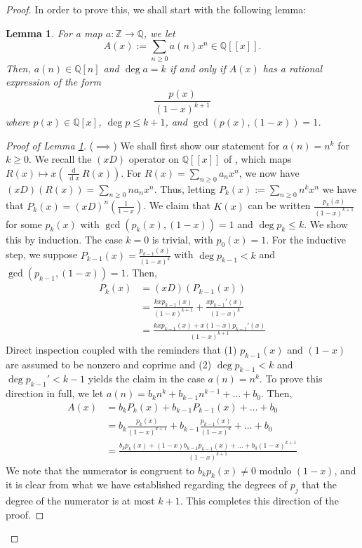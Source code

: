 \documentclass[english]{article}
\renewcommand{\d}[1]{\ensuremath{\operatorname{d}\!{#1}}}
\newcommand{\ddx}[1]{\frac{\d{}}{\d{#1}}}
\newcommand{\ZZ}{\mathbb{Z}}
\newcommand{\QQ}{\mathbb{Q}}
\newenvironment{subproof}[1][\proofname]{%
	\renewcommand{\qedsymbol}{$\blacksquare$}%
	\begin{proof}[#1]%
	}{%
	\end{proof}%
}
\newtheorem{lemma}[theorem]{Lemma}
\theoremstyle{remark}
\theoremstyle{definition}
\begin{document}
\begin{proof}
In order to prove this, we shall start with the following lemma: \begin{lemma}\label{lem:121b}For a map $a:\ZZ\to \QQ$, we let $$A(x):=\sum_{n\geq 0} a(n)x^n\in \QQ[[x]].$$ Then, $a(n)\in \QQ[n]$ and $\deg a=k$ if and only if $A(x)$ has a rational expression of the form $$\frac{p(x)}{(1-x)^{k+1}}$$ where $p(x)\in \QQ[x]$, $\deg p\leq k+1$, and $\gcd(p(x),(1-x))=1$.
\end{lemma}
\begin{subproof}[Proof of Lemma \ref{lem:121b}]
	($\implies $) We shall first show our statement for $a(n)=n^k$ for $k\geq 0$. We recall the $(xD)$ operator on $\QQ[[x]]$ of \cite{genfology}, which maps $R(x)\mapsto x(\ddx{x}R(x))$. For $R(x)=\sum_{n\geq 0}a_nx^n$, we now have $(xD)(R(x))=\sum_{n\geq 0}n a_nx^n$. Thus, letting $P_k(x):=\sum_{n\geq 0}n^kx^n$ we have that $P_k(x)=(xD)^n\left(\frac{1}{1-x}\right)$. We claim that $K(x)$ can be written $\frac{p_k(x)}{(1-x)^{k+1}}$ for some $p_k(x)$ with $\gcd (p_k(x),(1-x))=1$ and $\deg p_k\leq k$. We show this by induction. The case $k=0$ is trivial, with $p_0(x)=1$. For the inductive step, we suppose $P_{k-1}(x)=\frac{p_{k-1}(x)}{(1-x)^k}$ with $\deg{p_{k-1}}<k$ and $\gcd(p_{k-1},(1-x))=1$. Then, \begin{align*}P_k(x)&=(xD)(P_{k-1}(x))\\&=\frac{kxp_{k-1}(x)}{(1-x)^{k+1}}+\frac{xp_{k-1}'(x)}{(1-x)^{k}}\\&=\frac{kxp_{k-1}(x)+x(1-x)p_{k-1}'(x)}{(1-x)^{k+1}}\end{align*}
	Direct inspection coupled with the reminders that (1) $p_{k-1}(x)$ and $(1-x)$ are assumed to be nonzero and coprime and (2) $\deg p_{k-1}<k$ and $\deg p_{k-1}'<k-1$ yields the claim in the case $a(n)=n^k$. To prove this direction in full, we let $a(n)=b_kn^k+b_{k-1}n^{k-1}+\hdots+b_0$. Then, \begin{align*}
		A(x)&=b_kP_k(x)+b_{k-1}P_{k-1}(x)+\hdots +b_0\\
		&=b_{k}\frac{p_k(x)}{(1-x)^{k+1}}+b_{k-1}\frac{p_{k-1}(x)}{(1-x)^{k}}+\hdots +b_0\\
		&=\frac{b_kp_k(x)+(1-x)b_{k-1}p_{k-1}(x)+\hdots+b_0(1-x)^{k+1}}{(1-x)^{k+1}}
	\end{align*}
	We note that the numerator is congruent to $b_kp_k(x)\neq 0$ modulo $(1-x)$, and it is clear from what we have established regarding the degrees of $p_j$ that the degree of the numerator is at most $k+1$. This completes this direction of the proof.
	

\end{subproof}
\end{proof}
\end{document}
